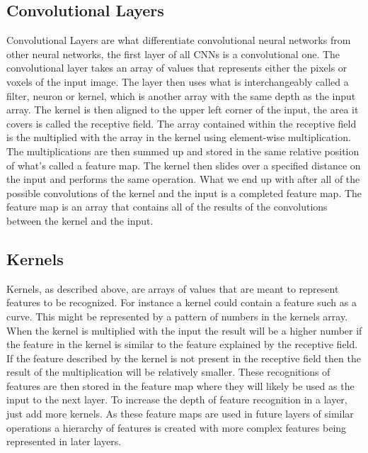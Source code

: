 \documentclass{sig-alternate}
\begin{document}
\subsection{Convolutional Layers}
\label{sec:convolutionalLayers}

Convolutional Layers are what differentiate convolutional neural networks from other neural networks, the first layer of all CNNs is a convolutional one. The convolutional layer takes an array of values that represents either the pixels or voxels of the input image. The layer then uses what is interchangeably called a filter, neuron or kernel, which is another array with the same depth as the input array. The kernel is then aligned to the upper left corner of the input, the area it covers is called the receptive field. The array  contained within the receptive field is the multiplied with the array in the kernel using element-wise multiplication. The multiplications are then summed up and stored in the same relative position of what's called a feature map. The kernel then slides over a specified distance on the input and performs the same operation. What we end up with after all of the possible convolutions of the kernel and the input is a completed feature map. The feature map is an array that contains all of the results of the convolutions between the kernel and the input.

\subsection{Kernels}
\label{sec:kernels}

Kernels, as described above, are arrays of values that are meant to represent features to be recognized. For instance a kernel could contain a feature such as a curve. This might be represented by a pattern of numbers in the kernels array. When the kernel is multiplied with the input the result will be a higher number if the feature in the kernel is similar to the feature explained by the receptive field. If the feature described by the kernel is not present in the receptive field then the result of the multiplication will be relatively smaller. These recognitions of features are then stored in the feature map where they will likely be used as the input to the next layer. To increase the depth of feature recognition in a layer, just add more kernels. As these feature maps are used in future layers of similar operations a hierarchy of features is created with more complex features being represented in later layers.
\end{document}

